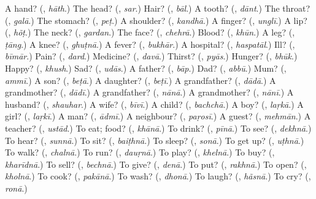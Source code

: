 \begin{tcolorbox}[breakable,colback=teal!4,colframe=teal!35!black,title={Before you move on}]
A hand? (\textbf{}, \emph{hāth}.) The head? (\textbf{}, \emph{sar}.) Hair? (\textbf{}, \emph{bāl}.) A tooth? (\textbf{}, \emph{dānt}.) The throat? (\textbf{}, \emph{galā}.) The stomach? (\textbf{}, \emph{peṭ}.) A shoulder? (\textbf{}, \emph{kandhā}.) A finger? (\textbf{}, \emph{unglī}.) A lip? (\textbf{}, \emph{hõṭ}.) The neck? (\textbf{}, \emph{gardan}.) The face? (\textbf{}, \emph{chehrā}.) Blood? (\textbf{}, \emph{khūn}.) A leg? (\textbf{}, \emph{ṭāng}.) A knee? (\textbf{}, \emph{ghuṭnā}.) A fever? (\textbf{}, \emph{bukhār}.) A hospital? (\textbf{}, \emph{haspatāl}.) Ill? (\textbf{}, \emph{bīmār}.) Pain? (\textbf{}, \emph{dard}.) Medicine? (\textbf{}, \emph{davā}.) Thirst? (\textbf{}, \emph{pyās}.) Hunger? (\textbf{}, \emph{bhūk}.) Happy? (\textbf{}, \emph{khush}.) Sad? (\textbf{}, \emph{udās}.) A father? (\textbf{}, \emph{bāp}.) Dad? (\textbf{}, \emph{abbū}.) Mum? (\textbf{}, \emph{ammī}.) A son? (\textbf{}, \emph{beṭā}.) A daughter? (\textbf{}, \emph{beṭī}.) A grandfather? (\textbf{}, \emph{dādā}.) A grandmother? (\textbf{}, \emph{dādī}.) A grandfather? (\textbf{}, \emph{nānā}.) A grandmother? (\textbf{}, \emph{nānī}.) A husband? (\textbf{}, \emph{shauhar}.) A wife? (\textbf{}, \emph{bīvī}.) A child? (\textbf{}, \emph{bachchā}.) A boy? (\textbf{}, \emph{laṛkā}.) A girl? (\textbf{}, \emph{laṛkī}.) A man? (\textbf{}, \emph{ādmī}.) A neighbour? (\textbf{}, \emph{paṛosī}.) A guest? (\textbf{}, \emph{mehmān}.) A teacher? (\textbf{}, \emph{ustād}.) To eat; food? (\textbf{}, \emph{khānā}.) To drink? (\textbf{}, \emph{pīnā}.) To see? (\textbf{}, \emph{dekhnā}.) To hear? (\textbf{}, \emph{sunnā}.) To sit? (\textbf{}, \emph{baiṭhnā}.) To sleep? (\textbf{}, \emph{sonā}.) To get up? (\textbf{}, \emph{uṭhnā}.) To walk? (\textbf{}, \emph{chalnā}.) To run? (\textbf{}, \emph{dauṛnā}.) To play? (\textbf{}, \emph{khelnā}.) To buy? (\textbf{}, \emph{kharīdnā}.) To sell? (\textbf{}, \emph{bechnā}.) To give? (\textbf{}, \emph{denā}.) To put? (\textbf{}, \emph{rakhnā}.) To open? (\textbf{}, \emph{kholnā}.) To cook? (\textbf{}, \emph{pakānā}.) To wash? (\textbf{}, \emph{dhonā}.) To laugh? (\textbf{}, \emph{hãsnā}.) To cry? (\textbf{}, \emph{ronā}.)
\end{tcolorbox}
